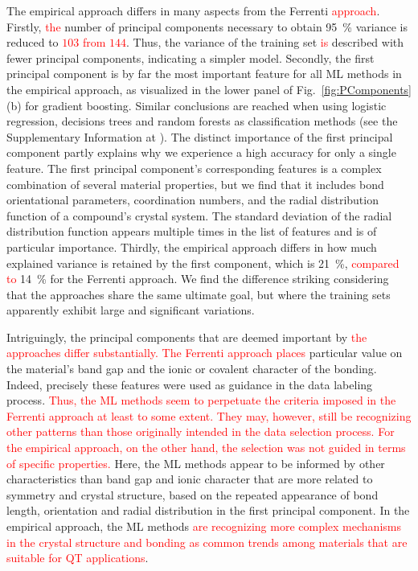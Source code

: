 \documentclass[superscriptaddress,unsortedaddress,
 amsmath,amssymb,
 aps,
]{revtex4-2}
\newcommand{\mrk}[1]{\textcolor{red}{#1}}
\begin{document}
The empirical approach differs in many aspects from the Ferrenti \mrk{approach}. 
Firstly, \mrk{the} number of principal components necessary to obtain \SI{95}{\percent} variance is reduced to \mrk{$103$ from $144$}. 
Thus, the variance of the training set \mrk{is} described with fewer principal components, indicating a simpler model. Secondly, the first principal component is by far the most important feature for all ML methods in the empirical approach, as visualized in the lower panel of Fig.~\ref{fig:PComponents}(b) for gradient boosting. Similar conclusions are reached when using logistic regression, decisions trees and random forests as classification methods (see the Supplementary Information at \cite{supplementary}). 
The distinct importance of the first principal component partly explains why we experience a high accuracy for only a single feature. The first principal component's corresponding features is a complex combination of several material properties, but we find that it includes bond orientational parameters, coordination numbers, and the radial distribution function of a compound's crystal system. 
The standard deviation of the radial distribution function appears multiple times in the list of features and is of particular importance. 
Thirdly, the empirical approach differs in how much explained variance is retained by the first component, which is \SI{21}{\percent}, \mrk{compared to} \SI{14}{\percent} for the Ferrenti approach. 
We find the difference striking considering that the approaches share the same ultimate goal, but where the training sets apparently exhibit large and significant variations. 

Intriguingly, the principal components that are deemed important by \mrk{the approaches differ substantially. The Ferrenti approach places}  particular value on the material's band gap and the ionic or covalent character of the bonding. Indeed, precisely these features were used as guidance in the data labeling process. \mrk{Thus, the ML methods seem to perpetuate the criteria imposed in the Ferrenti approach at least to some extent. They may, however, still be recognizing other patterns than those originally intended in the data selection process.} \mrk{For the empirical approach, on the other hand, the selection was not guided in terms of specific properties.} Here, the ML methods appear to be informed by other characteristics than band gap and ionic character that are more related to symmetry and crystal structure, based on the repeated appearance of bond length, orientation and radial distribution in the first principal component. In the empirical approach, the ML methods \mrk{are recognizing more complex mechanisms in the crystal structure and bonding as common trends among materials that are suitable for QT applications}.  
\end{document}
